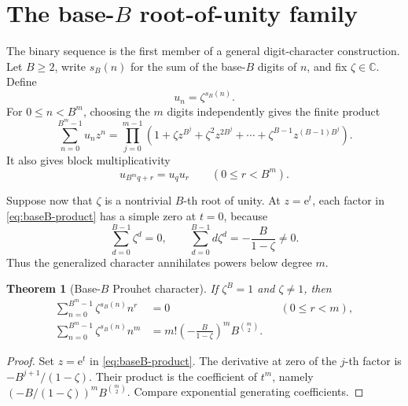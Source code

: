 \documentclass[11pt,oneside]{article}
\newtheorem{theorem}{Theorem}[section]
\theoremstyle{definition}
\theoremstyle{remark}
\newcommand{\C}{\mathbb C}
\newcommand{\e}{\mathrm e}
\begin{document}
\section{The base-\texorpdfstring{\(B\)}{B} root-of-unity family}
\label{sec:baseB}

The binary sequence is the first member of a general digit-character construction.  Let
\(B\ge2\), write \(s_B(n)\) for the sum of the base-\(B\) digits of \(n\), and fix
\(\zeta\in\C\).  Define
\begin{equation}
  u_n=\zeta^{s_B(n)}.                                       \label{eq:baseB-character}
\end{equation}
For \(0\le n<B^m\), choosing the \(m\) digits independently gives the finite product
\begin{equation}
  \boxed{
  \sum_{n=0}^{B^m-1}u_nz^n
   =\prod_{j=0}^{m-1}
     \left(1+\zeta z^{B^j}+\zeta^2z^{2B^j}+\cdots+
           \zeta^{B-1}z^{(B-1)B^j}\right).}                \label{eq:baseB-product}
\end{equation}
It also gives block multiplicativity
\begin{equation}
  u_{B^mq+r}=u_qu_r\qquad(0\le r<B^m).                     \label{eq:baseB-block}
\end{equation}

Suppose now that \(\zeta\) is a nontrivial \(B\)-th root of unity.  At \(z=\e^t\), each
factor in \eqref{eq:baseB-product} has a simple zero at \(t=0\), because
\begin{equation}
  \sum_{d=0}^{B-1}\zeta^d=0,
  \qquad
  \sum_{d=0}^{B-1}d\zeta^d=-\frac{B}{1-\zeta}\ne0.         \label{eq:root-unity-derivative}
\end{equation}
Thus the generalized character annihilates powers below degree \(m\).

\begin{theorem}[Base-\(B\) Prouhet character]
\label{thm:baseB-Prouhet}
If \(\zeta^B=1\) and \(\zeta\ne1\), then
\begin{align}
  \sum_{n=0}^{B^m-1}\zeta^{s_B(n)}n^r&=0 &&(0\le r<m),     \label{eq:baseB-Prouhet-zero}\\
  \sum_{n=0}^{B^m-1}\zeta^{s_B(n)}n^m
   &=m!\left(-\frac{B}{1-\zeta}\right)^m
       B^{\binom m2}.                                      \label{eq:baseB-Prouhet-boundary}
\end{align}
\end{theorem}

\begin{proof}
Set \(z=\e^t\) in \eqref{eq:baseB-product}.  The derivative at zero of the \(j\)-th factor
is \(-B^{j+1}/(1-\zeta)\).  Their product is the coefficient of \(t^m\), namely
\((-B/(1-\zeta))^mB^{\binom m2}\).  Compare exponential generating coefficients.
\end{proof}
\end{document}
